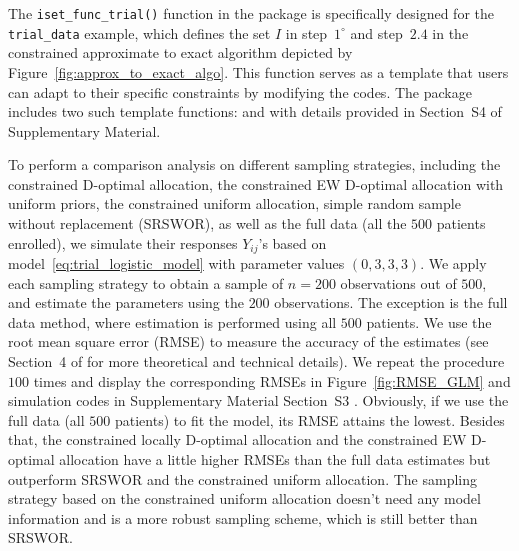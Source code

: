 The \texttt{iset\_func\_trial()} function in the  package is specifically designed for the \texttt{trial\_data} example, which defines the set $I$ in step~$1^\circ$ and step~$2.4$ in the constrained approximate to exact algorithm depicted by Figure~\ref{fig:approx_to_exact_algo}. This function serves as a template that users can adapt to their specific constraints by modifying the codes. The package includes two such template functions: \texttt{} and \texttt{} with details provided in Section~S4 of Supplementary Material.

To perform a comparison analysis on different sampling strategies, including the constrained D-optimal allocation, the constrained EW D-optimal allocation with uniform priors, the constrained uniform allocation, simple random sample without replacement (SRSWOR), as well as the full data (all the $500$ patients enrolled), we simulate their responses $Y_{ij}$'s based on model~\eqref{eq:trial_logistic_model} with parameter values $(0,3,3,3)$. We apply each sampling strategy to obtain a sample of $n=200$ observations out of $500$, and estimate the parameters using the $200$ observations. The exception is the full data method, where estimation is performed using all $500$ patients. We use the root mean square error (RMSE) to measure the accuracy of the estimates (see Section~4 of \cite{huang2023constrained} for more theoretical and technical details). We repeat the procedure $100$ times and display the corresponding RMSEs in Figure~\ref{fig:RMSE_GLM} and simulation codes in Supplementary Material Section~S3 \citep{ggplot2, dplyr}. Obviously, if we use the full data (all $500$ patients) to fit the model, its RMSE attains the lowest. Besides that, the constrained locally D-optimal allocation and the constrained EW D-optimal allocation have a little higher RMSEs than the full data estimates but outperform SRSWOR and the constrained uniform allocation. The sampling strategy based on the constrained uniform allocation doesn't need any model information and is a more robust sampling scheme, which is still better than SRSWOR.


